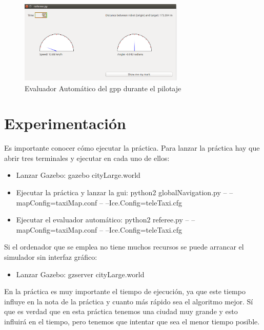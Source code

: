 \begin{figure}[H]
  \begin{center}
    \includegraphics[width=0.7\textwidth]{figures/GPP/referee2_gpp.png}
		\caption{Evaluador Automático del \acrshort{gpp} durante el pilotaje}
		\label{fig.referee2_gpp}
		\end{center}
\end{figure}


\section{Experimentación}
Es importante conocer cómo ejecutar la práctica. Para lanzar la práctica hay que abrir tres terminales y ejecutar en cada uno de ellos:

\begin{itemize}
\item Lanzar Gazebo: gazebo cityLarge.world
\item	Ejecutar la práctica y lanzar la \acrshort{gui}: python2 globalNavigation.py -- --mapConfig=taxiMap.conf -- --Ice.Config=teleTaxi.cfg
\item	Ejecutar el evaluador automático: python2 referee.py -- --mapConfig=taxiMap.conf -- --Ice.Config=teleTaxi.cfg
\end{itemize}

Si el ordenador que se emplea no tiene muchos recursos se puede arrancar el simulador sin interfaz gráfico:

\begin{itemize}
\item Lanzar Gazebo: gzserver cityLarge.world
\end{itemize}

En la práctica es muy importante el tiempo de ejecución, ya que este tiempo influye en la nota de la práctica y cuanto más rápido sea el algoritmo mejor. Sí que es verdad que en esta práctica tenemos una ciudad muy grande y esto influirá en el tiempo, pero tenemos que intentar que sea el menor tiempo posible.\\

